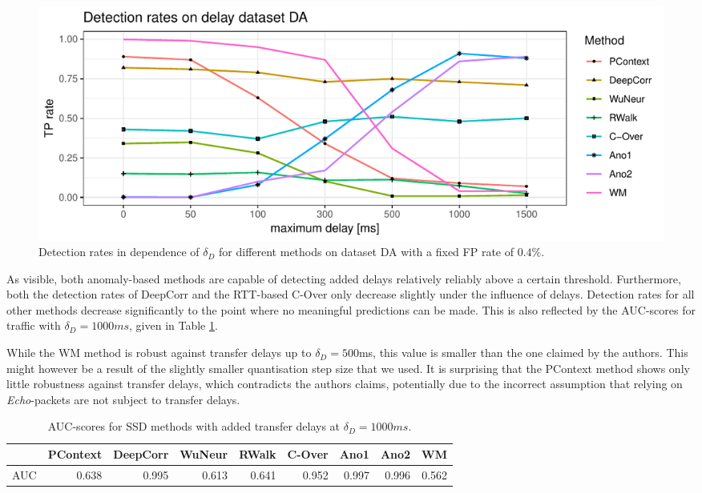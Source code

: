\documentclass[runningheads,11pt]{llncs}\usepackage[]{graphicx}\usepackage[]{color}
\makeatletter
\def\maxwidth{ %
  \ifdim\Gin@nat@width>\linewidth
    \linewidth
  \else
    \Gin@nat@width
  \fi
}
\newenvironment{knitrout}{}{} %
\makeatother
\begin{document}

\begin{knitrout}
\color{fgcolor}\begin{figure}
\includegraphics[width=\maxwidth]{figure/Delaydetection-1} \caption[Detection rates in dependence of $\delta_D$ for different methods on dataset DA with a fixed FP rate of $0.4\%$]{Detection rates in dependence of $\delta_D$ for different methods on dataset DA with a fixed FP rate of $0.4\%$.}\label{fig:Delaydetection}
\end{figure}


\end{knitrout}

As visible, both anomaly-based methods are capable of detecting added delays relatively reliably above a certain threshold. Furthermore, both the detection rates of DeepCorr and the RTT-based C-Over only decrease slightly under the influence of delays. Detection rates for all other methods decrease significantly to the point where no meaningful predictions can be made. This is also reflected by the AUC-scores for traffic with $\delta_D=1000ms$, given in Table \ref{Tab:AUCdelays}.

While the WM method is robust against transfer delays up to $\delta_D=500$ms, this value is smaller than the one claimed by the authors. This might however be a result of the slightly smaller quantisation step size that we used. It is surprising that the PContext method shows only little robustness against transfer delays, which contradicts the authors claims, potentially due to the incorrect assumption that relying on \textit{Echo}-packets are not subject to transfer delays.


\begin{table}
\centering
\begin{tabular}{l|r|r|r|r|r|r|r|r}
  \hline
 & PContext & DeepCorr & WuNeur & RWalk & C-Over & Ano1 & Ano2 & WM \\ 
  \hline
AUC & 0.638 & 0.995 & 0.613 & 0.641 & 0.952 & 0.997 & 0.996 & 0.562 \\ 
   \hline
\end{tabular}

\caption{AUC-scores for SSD methods with added transfer delays at $\delta_D=1000ms$.}\label{Tab:AUCdelays}
\end{table}
\end{document}
